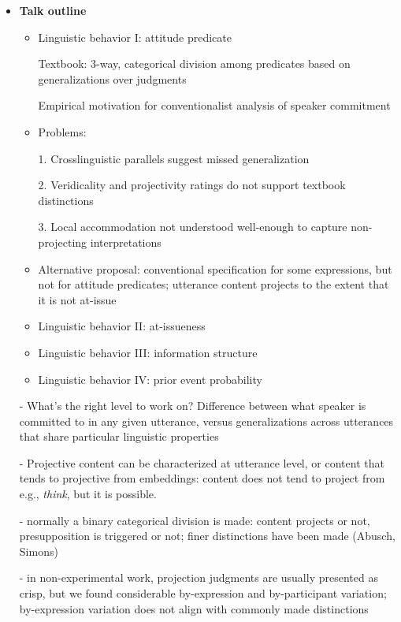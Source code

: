 \documentclass[11pt,fleqn]{article}
\newcommand{\6}{\mbox{$[\hspace*{-.6mm}[$}}
\newcommand{\9}{\mbox{$]\hspace*{-.6mm}]$}}
\begin{document}
\begin{itemize}[leftmargin=3ex,topsep=0pt,itemsep=-2pt]
\begin{itemize}[leftmargin=3ex,topsep=0pt,itemsep=-2pt]
\end{itemize}

\item {\bf Talk outline}

\begin{itemize}[leftmargin=3ex,topsep=0pt,itemsep=-2pt]

\item Linguistic behavior I: attitude predicate 

Textbook: 3-way, categorical division among predicates based on generalizations over judgments

Empirical motivation for conventionalist analysis of speaker commitment

\item Problems:

1. Crosslinguistic parallels suggest missed generalization

2. Veridicality and projectivity ratings do not support textbook distinctions

3. Local accommodation not understood well-enough to capture non-projecting interpretations

\item Alternative proposal: conventional specification for some expressions, but not for attitude predicates; utterance content projects to the extent that it is not at-issue

\item Linguistic behavior II: at-issueness

\item Linguistic behavior III: information structure

\item Linguistic behavior IV: prior event probability


\end{itemize}


- What's the right level to work on? Difference between what speaker is committed to in any given utterance, versus generalizations across utterances that share particular linguistic properties

- Projective content can be characterized at utterance level, or content that tends to projective from embeddings: content does not tend to project from e.g., {\em think}, but it is possible.

- normally a binary categorical division is made: content projects or not, presupposition is triggered or not; finer distinctions have been made (Abusch, Simons)

- in non-experimental work, projection judgments are usually presented as crisp, but we found considerable by-expression and by-participant variation; by-expression variation does not align with commonly made distinctions


\end{itemize}
\end{document}
